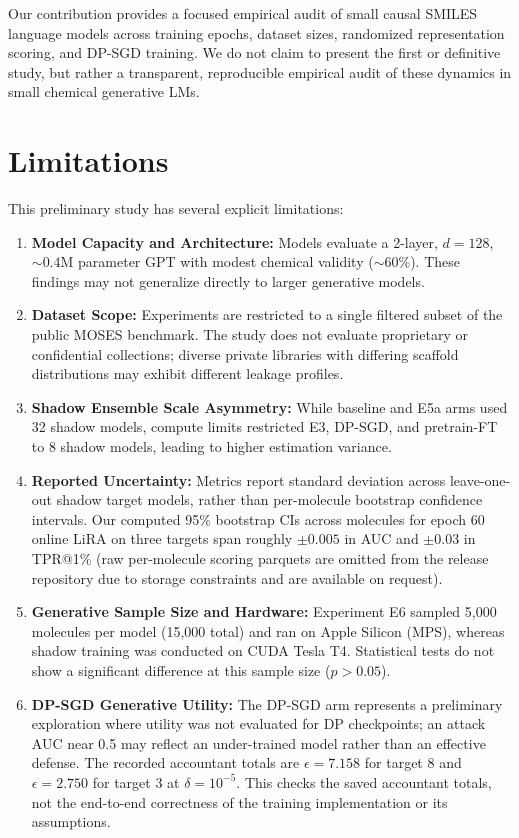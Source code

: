 \documentclass[10pt,journal,compsoc]{IEEEtran}
\begin{document}
Our contribution provides a focused empirical audit of small causal SMILES language models across training epochs, dataset sizes, randomized representation scoring, and DP-SGD training. We do not claim to present the first or definitive study, but rather a transparent, reproducible empirical audit of these dynamics in small chemical generative LMs.

\section{Limitations}
This preliminary study has several explicit limitations:
\begin{enumerate}
    \item \textbf{Model Capacity and Architecture:} Models evaluate a 2-layer, $d=128$, $\sim 0.4\text{M}$ parameter GPT with modest chemical validity ($\sim 60\%$). These findings may not generalize directly to larger generative models.
    \item \textbf{Dataset Scope:} Experiments are restricted to a single filtered subset of the public MOSES benchmark. The study does not evaluate proprietary or confidential collections; diverse private libraries with differing scaffold distributions may exhibit different leakage profiles.
    \item \textbf{Shadow Ensemble Scale Asymmetry:} While baseline and E5a arms used 32 shadow models, compute limits restricted E3, DP-SGD, and pretrain-FT to 8 shadow models, leading to higher estimation variance.
    \item \textbf{Reported Uncertainty:} Metrics report standard deviation across leave-one-out shadow target models, rather than per-molecule bootstrap confidence intervals. Our computed 95\% bootstrap CIs across molecules for epoch 60 online LiRA on three targets span roughly $\pm 0.005$ in AUC and $\pm 0.03$ in TPR@1\% (raw per-molecule scoring parquets are omitted from the release repository due to storage constraints and are available on request).
    \item \textbf{Generative Sample Size and Hardware:} Experiment E6 sampled 5,000 molecules per model (15,000 total) and ran on Apple Silicon (MPS), whereas shadow training was conducted on CUDA Tesla T4. Statistical tests do not show a significant difference at this sample size ($p > 0.05$).
    \item \textbf{DP-SGD Generative Utility:} The DP-SGD arm represents a preliminary exploration where utility was not evaluated for DP checkpoints; an attack AUC near 0.5 may reflect an under-trained model rather than an effective defense. The recorded accountant totals are $\epsilon=7.158$ for target 8 and $\epsilon=2.750$ for target 3 at $\delta=10^{-5}$. This checks the saved accountant totals, not the end-to-end correctness of the training implementation or its assumptions.

\end{enumerate}
\end{document}
